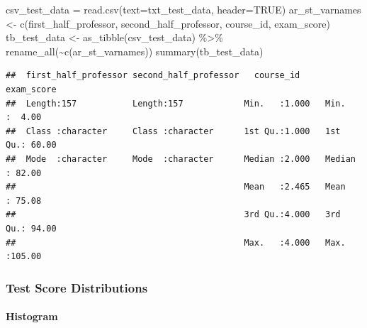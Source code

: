 \documentclass[
]{book}
\newenvironment{Shaded}{\begin{snugshade}}{\end{snugshade}}
\newcommand{\AttributeTok}[1]{\textcolor[rgb]{0.77,0.63,0.00}{#1}}
\newcommand{\ConstantTok}[1]{\textcolor[rgb]{0.00,0.00,0.00}{#1}}
\newcommand{\FunctionTok}[1]{\textcolor[rgb]{0.00,0.00,0.00}{#1}}
\newcommand{\NormalTok}[1]{#1}
\newcommand{\OtherTok}[1]{\textcolor[rgb]{0.56,0.35,0.01}{#1}}
\newcommand{\SpecialCharTok}[1]{\textcolor[rgb]{0.00,0.00,0.00}{#1}}
\newcommand{\StringTok}[1]{\textcolor[rgb]{0.31,0.60,0.02}{#1}}
\begin{document}
\begin{Shaded}
\begin{Highlighting}[]
\NormalTok{csv\_test\_data }\OtherTok{=} \FunctionTok{read.csv}\NormalTok{(}\AttributeTok{text=}\NormalTok{txt\_test\_data, }\AttributeTok{header=}\ConstantTok{TRUE}\NormalTok{)}
\NormalTok{ar\_st\_varnames }\OtherTok{\textless{}{-}} \FunctionTok{c}\NormalTok{(}\StringTok{\textquotesingle{}first\_half\_professor\textquotesingle{}}\NormalTok{,}
                    \StringTok{\textquotesingle{}second\_half\_professor\textquotesingle{}}\NormalTok{,}
                    \StringTok{\textquotesingle{}course\_id\textquotesingle{}}\NormalTok{, }\StringTok{\textquotesingle{}exam\_score\textquotesingle{}}\NormalTok{)}
\NormalTok{tb\_test\_data }\OtherTok{\textless{}{-}} \FunctionTok{as\_tibble}\NormalTok{(csv\_test\_data) }\SpecialCharTok{\%\textgreater{}\%} 
  \FunctionTok{rename\_all}\NormalTok{(}\SpecialCharTok{\textasciitilde{}}\FunctionTok{c}\NormalTok{(ar\_st\_varnames))}
\FunctionTok{summary}\NormalTok{(tb\_test\_data)}
\end{Highlighting}
\end{Shaded}

\begin{verbatim}
##  first_half_professor second_half_professor   course_id       exam_score    
##  Length:157           Length:157            Min.   :1.000   Min.   :  4.00  
##  Class :character     Class :character      1st Qu.:1.000   1st Qu.: 60.00  
##  Mode  :character     Mode  :character      Median :2.000   Median : 82.00  
##                                             Mean   :2.465   Mean   : 75.08  
##                                             3rd Qu.:4.000   3rd Qu.: 94.00  
##                                             Max.   :4.000   Max.   :105.00
\end{verbatim}

\hypertarget{test-score-distributions}{%
\subsubsection{Test Score Distributions}\label{test-score-distributions}}

\hypertarget{histogram-1}{%
\paragraph{Histogram}\label{histogram-1}}
\end{document}
